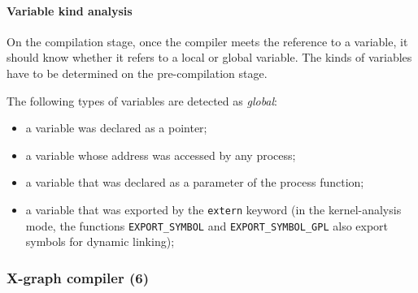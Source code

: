 

\paragraph{Variable kind analysis}
\label{ch:impl:proc:x-pre-compiler:var}

On the compilation stage, once the compiler meets the reference to a variable, it should know whether it refers to a local or global variable.
The kinds of variables have to be determined on the pre-compilation stage.

\vspace{1em}
The following types of variables are detected as \textit{global}:
\begin{itemize}
\item a variable was declared as a pointer;
\item a variable whose address was accessed by any process;
\item a variable that was declared as a parameter of the process function;
\item a variable that was exported by the \texttt{extern} keyword (in the kernel-analysis mode, the functions \texttt{EXPORT\_SYMBOL} and \texttt{EXPORT\_SYMBOL\_GPL} also export symbols for dynamic linking); %
\end{itemize}


\subsubsection{X-graph compiler (6)}
\label{ch:impl:proc:x-compiler}

